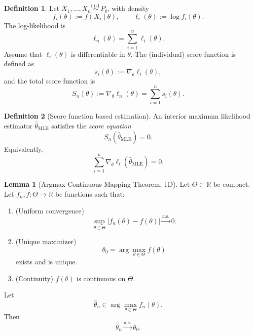 \documentclass[11pt]{article}
\theoremstyle{definition}
\newtheorem{defn}{Definition}[section]
\newtheorem{lemma}{Lemma}[section]
\begin{document}
\begin{defn}
    Let \(X_1, \dots, X_n \overset{\text{i.i.d.}}{\sim} P_\theta\), with density
\[
f_i(\theta) := f(X_i \mid \theta), 
\qquad 
\ell_i(\theta) := \log f_i(\theta).
\]
The log-likelihood is
\[
\ell_n(\theta)
= \sum_{i=1}^n \ell_i(\theta).
\]
Assume that \(\ell_i(\theta)\) is differentiable in \(\theta\).
The (individual) score function is defined as
\[
s_i(\theta)
:= \nabla_\theta \ell_i(\theta),
\]
and the total score function is
\[
S_n(\theta)
:= \nabla_\theta \ell_n(\theta)
= \sum_{i=1}^n s_i(\theta).
\]
\end{defn}
\begin{defn}[Score function based estimation]
    An interior maximum likelihood estimator \(\hat{\theta}_{\mathrm{MLE}}\) satisfies the
\emph{score equation}
\[
S_n(\hat{\theta}_{\mathrm{MLE}}) = 0.
\]
Equivalently,
\[
\sum_{i=1}^n \nabla_\theta \ell_i(\hat{\theta}_{\mathrm{MLE}}) = 0.
\]
\end{defn}

\begin{lemma}[Argmax Continuous Mapping Theorem, 1D]
Let $\Theta \subset \mathbb{R}$ be compact.  
Let $f_n, f : \Theta \to \mathbb{R}$ be functions such that:

\begin{enumerate}
  \item (Uniform convergence)
  \[
  \sup_{\theta \in \Theta} |f_n(\theta) - f(\theta)| \xrightarrow{\text{a.s.}} 0.
  \]
  \item (Unique maximizer)
  \[
  \theta_0 = \arg\max_{\theta \in \Theta} f(\theta)
  \]
  exists and is unique.
  \item (Continuity) $f(\theta)$ is continuous on $\Theta$.
\end{enumerate}

Let
\[
\hat{\theta}_n \in \arg\max_{\theta \in \Theta} f_n(\theta).
\]
Then
\[
\hat{\theta}_n \xrightarrow{\text{a.s.}} \theta_0.
\]
\end{lemma}
\end{document}
